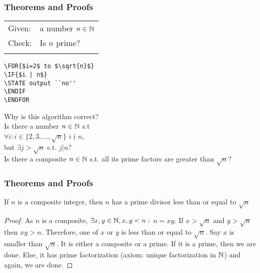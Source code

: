  \begin{frame}[fragile]
\frametitle{Theorems and Proofs}

\begin{tabular}{ll}
Given: & a number $n \in {{\mathbb{N}}}$\\
Check: & Is $n$ prime?\\
& \\
\end{tabular}

%
\begin{lstlisting}
\FOR{$i=2$ to $\sqrt{n}$}
\IF{$i | n$}
\STATE output ``no''
\ENDIF
\ENDFOR
\end{lstlisting}
Why is this algorithm correct?\\

Is there a number $n \in {{\mathbb{N}}}$ s.t \\
$\forall i: i \in \{2,3,\ldots, \sqrt{n}\}$ $i \nmid n$,\\
but $\exists j > \sqrt{n}$ s.t. $j | n$?\\
\vspace{0.1in}
Is there a composite $n \in {{\mathbb{N}}}$ s.t. all its prime factors are greater than $\sqrt{n}$?\\
\vspace{0.1in}


\end{frame}
 \begin{frame}[fragile]
\frametitle{Theorems and Proofs}

\begin{theorem}
If $n$ is a composite integer, then $n$ has a prime divisor less than or equal to $\sqrt{n}$
\end{theorem}
\begin{proof}
As $n$ is a composite, $\exists x,y \in {{\mathbb{N}}}, x,y < n:$ $n =xy$. If $x > \sqrt{n}$ and $y > \sqrt{n}$ then
$xy > n$. Therefore, one of $x$ or $y$ is less than or equal to $\sqrt{n}$. Say $x$ is smaller than $\sqrt{n}$. It is either a composite or a prime. If it is a prime, then we are done. Else, it has prime factorization (axiom: unique factorization in ${{\mathbb{N}}}$) and again, we are done.
\end{proof}
\end{frame}


